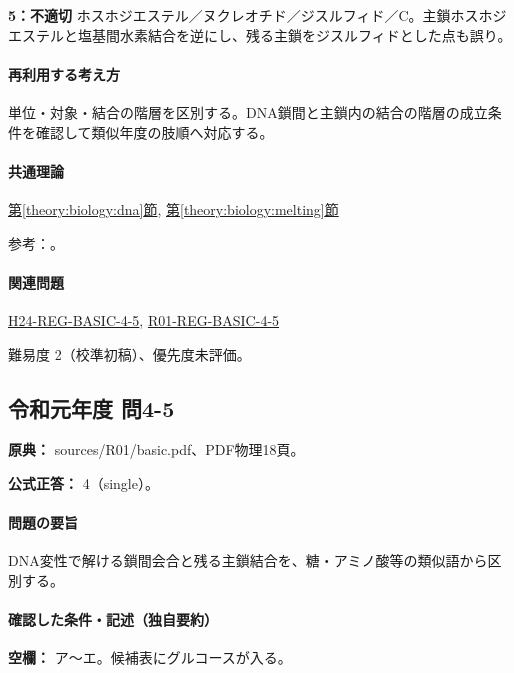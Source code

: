 \noindent\textbf{5：不適切} ホスホジエステル／ヌクレオチド／ジスルフィド／C。主鎖ホスホジエステルと塩基間水素結合を逆にし、残る主鎖をジスルフィドとした点も誤り。\par

\paragraph{再利用する考え方} 単位・対象・結合の階層を区別する。DNA鎖間と主鎖内の結合の階層の成立条件を確認して類似年度の肢順へ対応する。

\paragraph{共通理論} \hyperref[theory:biology:dna]{第\ref*{theory:biology:dna}節}, \hyperref[theory:biology:melting]{第\ref*{theory:biology:melting}節}

\par 参考：\cite{bu_dna_melting,nhgri_dna}。

\paragraph{関連問題} \hyperref[q:h24-reg-basic-4-5]{H24-REG-BASIC-4-5}, \hyperref[q:r01-reg-basic-4-5]{R01-REG-BASIC-4-5}

\par 難易度 2（校準初稿）、優先度未評価。

\subsection{令和元年度 問4-5}
\label{q:r01-reg-basic-4-5}

\noindent\textbf{原典：} sources/R01/basic.pdf、PDF物理18頁。

\textbf{公式正答：} 4（single）。

\paragraph{問題の要旨} DNA変性で解ける鎖間会合と残る主鎖結合を、糖・アミノ酸等の類似語から区別する。

\paragraph{確認した条件・記述（独自要約）}\mbox{}\par

\noindent\textbf{空欄：} ア〜エ。候補表にグルコースが入る。\par


